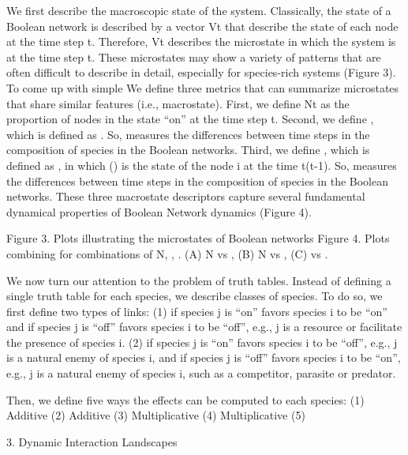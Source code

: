 We first describe the macroscopic state of the system. Classically, the state of a Boolean network is described by a vector Vt that describe the state of each node at the time step t. Therefore, Vt describes the microstate in which the system is at the time step t. These microstates may show a variety of patterns that are often difficult to describe in detail, especially for species-rich systems (Figure 3). To come up with simple  
We define three metrics that can summarize microstates that share similar features (i.e., macrostate). First, we define Nt as the proportion of nodes in the state “on” at the time step t. Second, we define , which is defined as . So,  measures the differences between time steps in the composition of species in the Boolean networks. Third, we define , which is defined as , in which () is the state of the node i at the time t(t-1). So,  measures the differences between time steps in the composition of species in the Boolean networks. These three macrostate descriptors capture several fundamental dynamical properties of Boolean Network dynamics (Figure 4).

Figure 3. Plots illustrating the microstates of Boolean networks
Figure 4. Plots combining for combinations of N, , . (A) N vs , (B) N vs , (C)  vs .

	We now turn our attention to the problem of truth tables. Instead of defining a single truth table for each species, we describe classes of species. To do so, we first define two types of links: 
    (1) if species j is “on” favors species i to be “on” and if species j is “off” favors species i to be “off”, e.g., j is a resource or facilitate the presence of species i.
    (2) if species j is “on” favors species i to be “off”, e.g., j is a natural enemy of species i, and if species j is “off” favors species i to be “on”, e.g., j is a natural enemy of species i, such as a competitor, parasite or predator. 

Then, we define five ways the effects can be computed to each species:
    (1) Additive 
    (2) Additive 
    (3) Multiplicative 
    (4) Multiplicative 
    (5) 


    3. Dynamic Interaction Landscapes




  